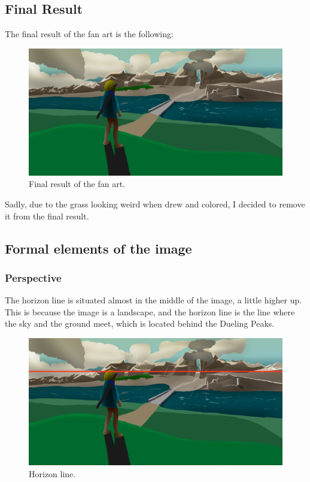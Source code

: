 \documentclass{cup-pan}
\begin{document}
    \subsection{Final Result}
        The final result of the fan art is the following:
        \begin{figure}[H]
            \includegraphics[width=\textwidth]{Imagenes/Fanart1/Color/IIII_Iteracion.png}
            \caption{Final result of the fan art.}
        \end{figure}
        Sadly, due to the grass looking weird when drew and colored, I decided to remove it from the final result.\\

    \subsection{Formal elements of the image}

        \subsubsection{Perspective}

            The horizon line is situated almost in the middle of the image, a little higher up. This is because the image is a landscape, and the horizon line is the line where the sky and the ground meet, which is located behind the Dueling Peaks. \\
            \begin{figure}[H]
                \includegraphics[width=\textwidth]{Imagenes/Fanart1/Analysis/horizonte.png}
                \caption{Horizon line.}
            \end{figure}
\end{document}
